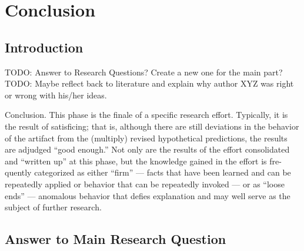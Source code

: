 
\chapter{Conclusion}

\label{ChapterConclusion}


\section{Introduction}

TODO: Answer to Research Questions? Create a new one for the main part?
TODO: Maybe reflect back to literature and explain why author XYZ was right or wrong with his/her ideas.

Conclusion. This phase is the finale of a specific research effort. Typically, it is the result of satisficing; that is, although there are still deviations in the behavior of the artifact from the (multiply) revised hypothetical predictions, the results are adjudged “good enough.” Not only are the results of the effort consolidated and “written up” at this phase, but the knowledge gained in the effort is fre- quently categorized as either “firm” — facts that have been learned and can be repeatedly applied or behavior that can be repeatedly invoked — or as “loose ends” — anomalous behavior that defies explanation and may well serve as the subject of further research.
\cite{Vaishnavi2008}




\section{Answer to Main Research Question}




